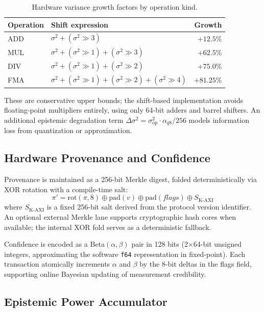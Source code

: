 \documentclass[journal]{IEEEtran}
\begin{document}
\begin{table}[!t]
\caption{Hardware variance growth factors by operation kind.}
\label{tab:hw-variance}
\centering
\begin{tabular}{llr}
\toprule
Operation & Shift expression & Growth \\
\midrule
ADD & $\sigma^2 + (\sigma^2 \gg 3)$ & $+12.5\%$ \\
MUL & $\sigma^2 + (\sigma^2 \gg 1) + (\sigma^2 \gg 3)$ & $+62.5\%$ \\
DIV & $\sigma^2 + (\sigma^2 \gg 1) + (\sigma^2 \gg 2)$ & $+75.0\%$ \\
FMA & $\sigma^2 + (\sigma^2 \gg 1) + (\sigma^2 \gg 2) + (\sigma^2 \gg 4)$ & $+81.25\%$ \\
\bottomrule
\end{tabular}
\end{table}

These are conservative upper bounds; the shift-based implementation avoids
floating-point multipliers entirely, using only 64-bit adders and barrel
shifters. An additional epistemic degradation term
$\Delta\sigma^2 = \sigma^2_{\text{op}} \cdot \alpha_{q8} / 256$ models
information loss from quantization or approximation.

\subsection{Hardware Provenance and Confidence}

Provenance is maintained as a 256-bit Merkle digest, folded
deterministically via XOR rotation with a compile-time salt:
\[
  \pi' = \text{rot}(\pi, 8) \oplus \text{pad}(v) \oplus \text{pad}(\textit{flags}) \oplus S_{\text{K-AXI}}
\]
where $S_{\text{K-AXI}}$ is a fixed 256-bit salt derived from the protocol
version identifier. An optional external Merkle lane supports
cryptographic hash cores when available; the internal XOR fold serves as a
deterministic fallback.

Confidence is encoded as a Beta$(\alpha, \beta)$ pair in 128 bits
(2$\times$64-bit unsigned integers, approximating the software \texttt{f64}
representation in fixed-point). Each transaction atomically increments $\alpha$
and $\beta$ by the 8-bit deltas in the flags field, supporting online
Bayesian updating of measurement credibility.

\subsection{Epistemic Power Accumulator}
\end{document}
